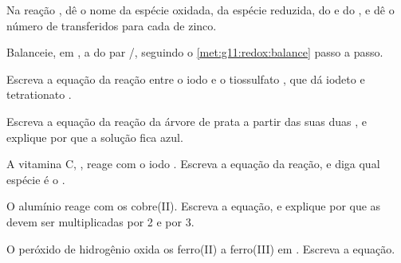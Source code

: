 \begin{exercise}[$\star$]\label{exo:g11:redox:5}
Na reação , dê o nome da espécie
oxidada, da espécie reduzida, do  e do , e dê o número de
 transferidos para cada  de zinco.
\end{exercise}

\begin{exercise}[$\star\star$]\label{exo:g11:redox:6}
Balanceie, em , a  do par /,
seguindo o \cref{met:g11:redox:balance} passo a passo.
\end{exercise}

\begin{exercise}[$\star\star$]\label{exo:g11:redox:7}
Escreva a equação da reação entre o iodo  e o  tiossulfato
, que dá  iodeto e  tetrationato .
\end{exercise}

\begin{exercise}[$\star\star$]\label{exo:g11:redox:8}
Escreva a equação da reação da árvore de prata a partir das suas duas
, e explique por que a solução fica azul.
\end{exercise}

\begin{exercise}[$\star\star$]\label{exo:g11:redox:9}
A vitamina C, , reage com o iodo . Escreva a equação
da reação, e diga qual espécie é o .
\end{exercise}

\begin{exercise}[$\star\star$]\label{exo:g11:redox:10}
O alumínio reage com os  cobre(II). Escreva a equação, e explique
por que as  devem ser multiplicadas por 2 e por 3.
\end{exercise}

\begin{exercise}[$\star\star$]\label{exo:g11:redox:11}
O peróxido de hidrogênio oxida os  ferro(II) a  ferro(III) em
. Escreva a equação.
\end{exercise}

